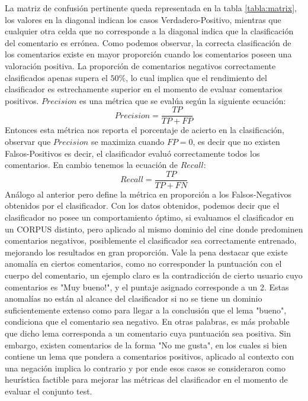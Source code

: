 \documentclass[12pt]{article}
\begin{document}
La matriz de confusión pertinente queda representada en la tabla \ref{tabla:matrix}, los valores en la diagonal indican los casos Verdadero-Positivo, mientras que cualquier otra celda que no corresponde a la diagonal indica que la clasificación del comentario es errónea. Como podemos observar, la correcta clasificación de los comentarios existe en mayor proporción cuando los comentarios poseen una valoración positiva. La proporción de comentarios negativos correctamente clasificados apenas supera el $50 \%$, lo cual implica que el rendimiento del clasificador es estrechamente superior en el momento de evaluar comentarios positivos.
$Precision$ es una métrica que se evalúa según la siguiente ecuación:
\begin{equation}
  Precision = \frac{TP}{TP + FP}
\end{equation}
Entonces esta métrica nos reporta el porcentaje de acierto en la clasificación, observar que $Precision$ se maximiza cuando $FP=0$, es decir que no existen Falsos-Positivos es decir, el clasificador evaluó correctamente todos los comentarios.
En cambio tenemos la ecuación de $Recall$:
\begin{equation}
  Recall = \frac{TP}{TP + FN}
\end{equation} 
Análogo al anterior pero define la métrica en proporción a los Falsos-Negativos obtenidos por el clasificador.
Con los datos obtenidos, podemos decir que el clasificador no posee un comportamiento óptimo, si evaluamos el clasificador en un CORPUS distinto, pero aplicado al mismo dominio del cine donde predominen comentarios negativos, posiblemente el clasificador sea correctamente entrenado, mejorando los resultados en gran proporción.
Vale la pena destacar que existe anomalía en ciertos comentarios, como no corresponder la puntuación con el cuerpo del comentario, un ejemplo claro es la contradicción de cierto usuario cuyo comentarios es "Muy bueno!", y el puntaje asignado corresponde a un 2. Estas anomalías no están al alcance del clasificador si no se tiene un dominio suficientemente extenso como para llegar a la conclusión que el lema "bueno", condiciona que el comentario sea negativo. En otras palabras, es más probable que dicho lema corresponda a un comentario cuya puntuación sea positiva. Sin embargo, existen comentarios de la forma "No me gusta", en los cuales si bien contiene un lema que pondera a comentarios positivos, aplicado al contexto con una negación implica lo contrario y por ende esos casos se consideraron como heurística factible para mejorar las métricas del clasificador en el momento de evaluar el conjunto test.
\end{document}
